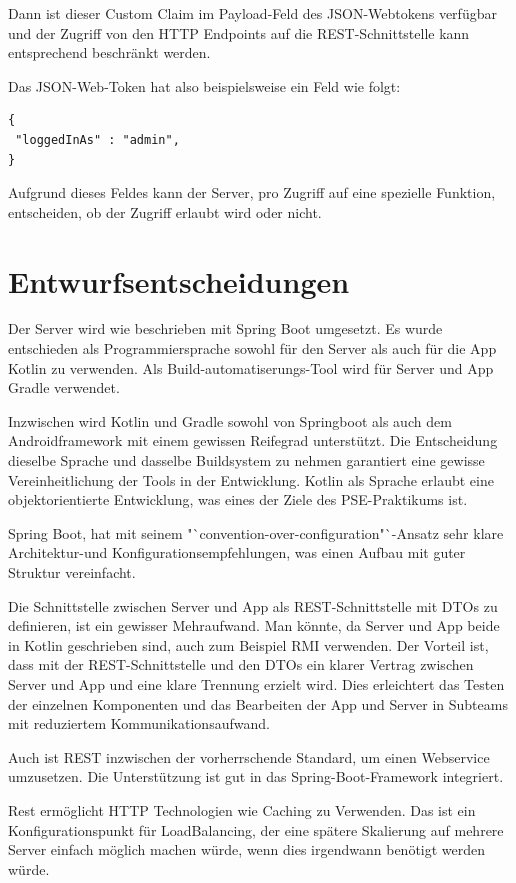 Dann ist dieser Custom Claim im Payload-Feld des JSON-Webtokens verfügbar und der Zugriff von den HTTP Endpoints auf die REST-Schnittstelle kann entsprechend beschränkt werden. 

Das JSON-Web-Token hat also beispielsweise ein Feld wie folgt:

\begin{lstlisting}
{
 "loggedInAs" : "admin",
}
\end{lstlisting}

Aufgrund dieses Feldes kann der Server, pro Zugriff auf eine spezielle Funktion, entscheiden, ob der Zugriff erlaubt wird oder nicht. 

\section{Entwurfsentscheidungen}
Der Server wird wie beschrieben mit Spring Boot umgesetzt. 
Es wurde entschieden  als Programmiersprache sowohl für den Server als auch für die App Kotlin zu verwenden.
Als Build-automatiserungs-Tool wird für Server und App Gradle verwendet. 

Inzwischen wird Kotlin und Gradle sowohl von Springboot als auch dem Androidframework mit einem gewissen Reifegrad unterstützt. Die Entscheidung dieselbe Sprache und dasselbe Buildsystem zu nehmen garantiert eine gewisse Vereinheitlichung der Tools in der Entwicklung. 
Kotlin als Sprache erlaubt eine objektorientierte Entwicklung, was eines der Ziele des PSE-Praktikums ist. 

Spring Boot, hat mit seinem "`convention-over-configuration"`-Ansatz sehr klare Architektur-und Konfigurationsempfehlungen, was einen Aufbau mit guter Struktur vereinfacht. 
 
Die Schnittstelle zwischen Server und App als REST-Schnittstelle mit DTOs zu definieren, ist ein gewisser Mehraufwand. Man könnte, da Server und App beide in Kotlin geschrieben sind, auch zum Beispiel RMI verwenden. Der Vorteil ist, dass mit der REST-Schnittstelle und den DTOs ein klarer Vertrag  zwischen Server und App und eine klare Trennung erzielt wird. Dies erleichtert das Testen der einzelnen Komponenten und das Bearbeiten der App und Server in Subteams mit reduziertem Kommunikationsaufwand. 

Auch ist REST inzwischen der vorherrschende Standard, um einen Webservice umzusetzen. Die Unterstützung ist gut in das Spring-Boot-Framework integriert. 

Rest ermöglicht HTTP Technologien wie Caching zu Verwenden. Das ist ein Konfigurationspunkt für LoadBalancing, der eine spätere Skalierung auf mehrere Server einfach möglich machen würde, wenn dies irgendwann benötigt werden würde.  

